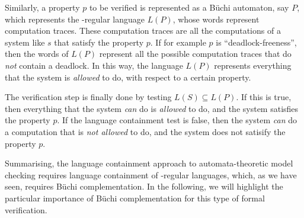 Similarly, a property $p$ to be verified is represented as a Büchi automaton, say $P$, which represents the \om-regular language $L(P)$, whose words represent computation traces. These computation traces are all the computations of a system like $s$ that satisfy the property $p$. If for example $p$ is ``deadlock-freeness'', then the words of $L(P)$ represent all the possible computation traces that do \textit{not} contain a deadlock. In this way, the language $L(P)$ represents everything that the system is \textit{allowed} to do, with respect to a certain property.

The verification step is finally done by testing $L(S) \subseteq L(P)$. If this is true, then everything that the system \textit{can} do is \textit{allowed} to do, and the system satisfies the property $p$. If the language containment test is false, then the system \textit{can} do a computation that is \textit{not allowed} to do, and the system does not satisify the property $p$.

Summarising, the language containment approach to automata-theoretic model checking requires language containment of \om-regular languages, which, as we have seen, requires Büchi complementation. In the following, we will highlight the particular importance of Büchi complementation for this type of formal verification.




